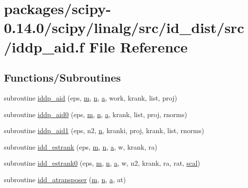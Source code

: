 \hypertarget{iddp__aid_8f}{}\section{packages/scipy-\/0.14.0/scipy/linalg/src/id\+\_\+dist/src/iddp\+\_\+aid.f File Reference}
\label{iddp__aid_8f}
\subsection*{Functions/\+Subroutines}
\begin{DoxyCompactItemize}
\item 
subroutine \hyperlink{iddp__aid_8f_abe003fb44007ef97615c815e56ed1ed1}{iddp\+\_\+aid} (eps, \hyperlink{indexexpr_8h_ab72fdb4031d47b75ab26dd18a437bcdc}{m}, \hyperlink{indexexpr_8h_ab427e2e2b4d6cec55fa088ea2a692ace}{n}, \hyperlink{gen__mat5files_8m_aae328bf20413f220e38aec4d95bfd6da}{a}, work, krank, list, proj)
\item 
subroutine \hyperlink{iddp__aid_8f_aaf23fe9dc5d5cbbe450ce0b60a757738}{iddp\+\_\+aid0} (eps, \hyperlink{indexexpr_8h_ab72fdb4031d47b75ab26dd18a437bcdc}{m}, \hyperlink{indexexpr_8h_ab427e2e2b4d6cec55fa088ea2a692ace}{n}, \hyperlink{gen__mat5files_8m_aae328bf20413f220e38aec4d95bfd6da}{a}, krank, list, proj, rnorms)
\item 
subroutine \hyperlink{iddp__aid_8f_a80981843c204544cf65630fd385d3f7f}{iddp\+\_\+aid1} (eps, n2, \hyperlink{indexexpr_8h_ab427e2e2b4d6cec55fa088ea2a692ace}{n}, kranki, proj, krank, list, rnorms)
\item 
subroutine \hyperlink{iddp__aid_8f_a21b3d360b5c7d13f143c3aa07058c64a}{idd\+\_\+estrank} (eps, \hyperlink{indexexpr_8h_ab72fdb4031d47b75ab26dd18a437bcdc}{m}, \hyperlink{indexexpr_8h_ab427e2e2b4d6cec55fa088ea2a692ace}{n}, \hyperlink{gen__mat5files_8m_aae328bf20413f220e38aec4d95bfd6da}{a}, w, krank, ra)
\item 
subroutine \hyperlink{iddp__aid_8f_ab58d3d9f274e39236c3239d18c71aab4}{idd\+\_\+estrank0} (eps, \hyperlink{indexexpr_8h_ab72fdb4031d47b75ab26dd18a437bcdc}{m}, \hyperlink{indexexpr_8h_ab427e2e2b4d6cec55fa088ea2a692ace}{n}, \hyperlink{gen__mat5files_8m_aae328bf20413f220e38aec4d95bfd6da}{a}, w, n2, krank, ra, rat, \hyperlink{dense_8h_a0440a74729365d9e7ed71b8f3927a27f}{scal})
\item 
subroutine \hyperlink{iddp__aid_8f_afa36202a2265e2e0247a851ecceaff5e}{idd\+\_\+atransposer} (\hyperlink{indexexpr_8h_ab72fdb4031d47b75ab26dd18a437bcdc}{m}, \hyperlink{indexexpr_8h_ab427e2e2b4d6cec55fa088ea2a692ace}{n}, \hyperlink{gen__mat5files_8m_aae328bf20413f220e38aec4d95bfd6da}{a}, at)
\end{DoxyCompactItemize}


